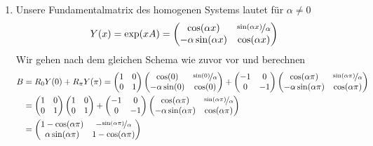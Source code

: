 \begin{solution}
\begin{enumerate}[label = \textbf{\alph*)}]
  \item Unsere Fundamentalmatrix des homogenen Systems lautet für $\alpha \neq 0$
  \begin{align*}
    Y(x) = \exp(xA) = \begin{pmatrix}
      \cos(\alpha x) & \nicefrac{\sin(\alpha x)}{\alpha}  \\ -\alpha\sin(\alpha x) & \cos(\alpha x)
    \end{pmatrix}
  \end{align*}
  Wir gehen nach dem gleichen Schema wie zuvor vor und berechnen
  \begin{align*}
    B &= R_0Y(0) + R_{\pi}Y(\pi) =
    \begin{pmatrix}
      1 & 0 \\ 0 & 1
    \end{pmatrix}
    \begin{pmatrix}
      \cos(0) & \nicefrac{\sin(0)}{\alpha}  \\ -\alpha\sin(0) & \cos(0)
    \end{pmatrix}
    + \begin{pmatrix}
      -1 & 0 \\ 0 & -1
    \end{pmatrix}
    \begin{pmatrix}
      \cos(\alpha \pi) & \nicefrac{\sin(\alpha \pi)}{\alpha}  \\ -\alpha\sin(\alpha \pi) & \cos(\alpha \pi)
    \end{pmatrix} \\
    &= \begin{pmatrix}
      1 & 0 \\ 0 & 1
    \end{pmatrix}
    \begin{pmatrix}
      1 & 0  \\ 0 & 1
    \end{pmatrix}
    + \begin{pmatrix}
      -1 & 0 \\ 0 & -1
    \end{pmatrix}
    \begin{pmatrix}
      \cos(\alpha \pi) & \nicefrac{\sin(\alpha \pi)}{\alpha}  \\ -\alpha\sin(\alpha \pi) & \cos(\alpha \pi)
    \end{pmatrix} \\
    &= \begin{pmatrix}
      1 - \cos(\alpha \pi) & -\nicefrac{\sin(\alpha \pi)}{\alpha} \\
      \alpha\sin(\alpha \pi) & 1 - \cos(\alpha \pi)

\end{pmatrix}
\end{align*}
\end{enumerate}
\end{solution}
